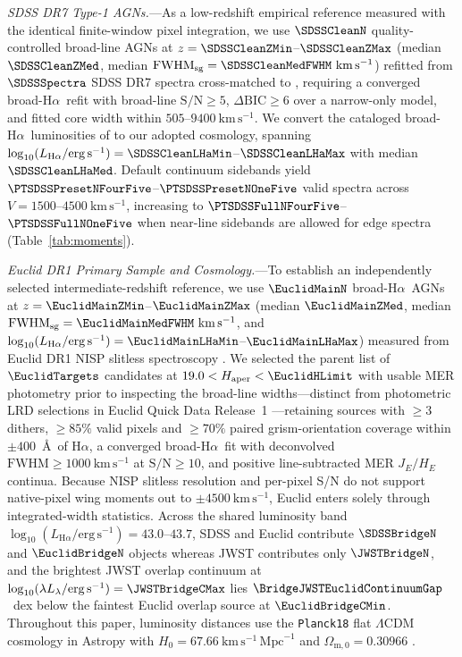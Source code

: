 \documentclass[twocolumn]{aastex631}
\newcommand{\Ha}{\ensuremath{\mathrm{H}\alpha}}
\newcommand{\kms}{\ensuremath{\mathrm{km\,s^{-1}}}}
\newcommand{\LHa}{\ensuremath{L_{\mathrm{H}\alpha}}}
\newcommand{\FWHM}{\ensuremath{\mathrm{FWHM}}}
\newcommand{\FWHMsg}{\ensuremath{\mathrm{FWHM}_{\mathrm{sg}}}}
\begin{document}
\emph{SDSS DR7 Type-1 AGNs.}---As a low-redshift empirical reference measured with the identical finite-window pixel integration, we use $\SDSSCleanN$ quality-controlled broad-line AGNs at $z = \SDSSCleanZMin$--$\SDSSCleanZMax$ (median $\SDSSCleanZMed$, median $\FWHMsg = \SDSSCleanMedFWHM~\kms$) refitted from $\SDSSSpectra$ SDSS DR7 spectra cross-matched to \citet{Shen2011}, requiring a converged broad-\Ha\ refit with broad-line $\mathrm{S/N} \ge 5$, $\Delta\mathrm{BIC} \ge 6$ over a narrow-only model, and fitted core width within $505$--$9400~\kms$. We convert the cataloged broad-\Ha\ luminosities of \citet{Shen2011} to our adopted cosmology, spanning $\log_{10}(\LHa/\mathrm{erg\,s^{-1}}) = \SDSSCleanLHaMin$--$\SDSSCleanLHaMax$ with median $\SDSSCleanLHaMed$. Default continuum sidebands yield $\PTSDSSPresetNFourFive$--$\PTSDSSPresetNOneFive$ valid spectra across $V = 1500$--$4500~\kms$, increasing to $\PTSDSSFullNFourFive$--$\PTSDSSFullNOneFive$ when near-line sidebands are allowed for edge spectra (Table~\ref{tab:moments}).

\emph{Euclid DR1 Primary Sample and Cosmology.}---To establish an independently selected intermediate-redshift reference, we use $\EuclidMainN$ broad-\Ha\ AGNs at $z = \EuclidMainZMin$--$\EuclidMainZMax$ (median $\EuclidMainZMed$, median $\FWHMsg = \EuclidMainMedFWHM~\kms$, and $\log_{10}(\LHa/\mathrm{erg\,s^{-1}}) = \EuclidMainLHaMin$--$\EuclidMainLHaMax$) measured from Euclid DR1 NISP slitless spectroscopy \citep{EuclidAussel2026,EuclidLeBrun2026,EuclidFumana2026}. We selected the parent list of $\EuclidTargets$ candidates at $19.0 < H_{\mathrm{aper}} < \EuclidHLimit$ with usable MER photometry prior to inspecting the broad-line widths---distinct from photometric LRD selections in Euclid Quick Data Release~1 \citep{EuclidBisigello2025}---retaining sources with $\ge 3$ dithers, $\ge 85\%$ valid pixels and $\ge 70\%$ paired grism-orientation coverage within $\pm 400$~\AA\ of \Ha, a converged broad-\Ha\ fit with deconvolved $\FWHM \ge 1000~\kms$ at $\mathrm{S/N} \ge 10$, and positive line-subtracted MER $J_E/H_E$ continua. Because NISP slitless resolution and per-pixel S/N do not support native-pixel wing moments out to $\pm 4500~\kms$, Euclid enters solely through integrated-width statistics. Across the shared luminosity band $\log_{10}(\LHa/\mathrm{erg\,s^{-1}}) = 43.0$--$43.7$, SDSS and Euclid contribute $\SDSSBridgeN$ and $\EuclidBridgeN$ objects whereas JWST contributes only $\JWSTBridgeN$, and the brightest JWST overlap continuum at $\log_{10}(\lambda L_\lambda/\mathrm{erg\,s^{-1}}) = \JWSTBridgeCMax$ lies $\BridgeJWSTEuclidContinuumGap$~dex below the faintest Euclid overlap source at $\EuclidBridgeCMin$. Throughout this paper, luminosity distances use the \texttt{Planck18} flat $\Lambda$CDM cosmology in Astropy with $H_0 = 67.66~\kms\,\mathrm{Mpc}^{-1}$ and $\Omega_{\mathrm{m},0} = 0.30966$ \citep{Planck2020}.
\end{document}
